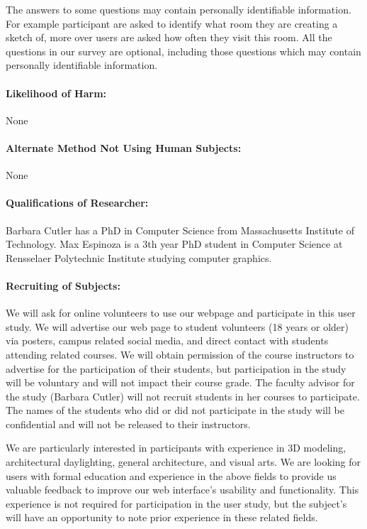 \documentclass[12pt]{article}
\begin{document}
\noindent
The answers to some questions may contain personally identifiable information.
For example participant are asked to identify what room they are creating a sketch of, more over users are asked how often they visit this room.
All the questions in our survey are optional, including those questions which may contain personally identifiable information.

\paragraph{Likelihood of  Harm:}   None
\paragraph{Alternate Method Not Using Human Subjects:} None

\paragraph{Qualifications of Researcher:}
Barbara Cutler has a PhD in Computer Science from Massachusetts
Institute of Technology.  Max Espinoza is a 3th year PhD student in
Computer Science at Rensselaer Polytechnic Institute studying computer
graphics.

\paragraph{Recruiting of Subjects:}
We will ask for online volunteers to use our webpage and participate in this
user study. We will advertise our web page to student volunteers (18 years or older) 
via posters, campus related social media, and direct contact with students attending 
related courses. We will obtain permission of the course instructors to advertise 
for the participation of their students, but participation in the study will be 
voluntary and will not impact their course grade. The faculty advisor for the 
study (Barbara Cutler) will not recruit students in her courses to participate.  
The names of the students who did or did not participate in the study will be 
confidential and will not be released to their instructors.

We are particularly interested in participants with experience in 3D modeling, 
architectural daylighting, general architecture, and visual arts. We are looking 
for users with formal education and experience in the above fields to provide 
us valuable feedback to improve our web interface's usability and functionality. 
This experience is not required for participation in the user study, but the 
subject's will have an opportunity to note prior experience in these related fields.
\end{document}
